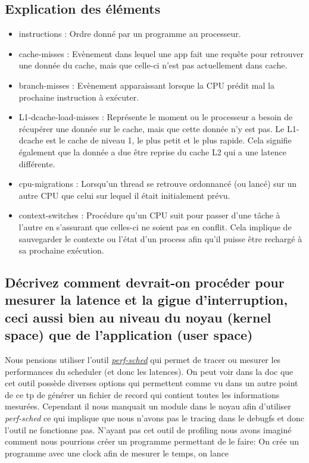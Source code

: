 \documentclass{ReportTemplate}
\begin{document}
\subsection{Explication des éléments}
\begin{itemize}
    \item instructions : Ordre donné par un programme au processeur.
    \item cache-misses : Evènement dans lequel une app fait une requête pour
    retrouver une donnée du cache, mais que celle-ci n'est pas actuellement dans
    cache.
    \item branch-misses : Evènement apparaissant lorsque la CPU prédit mal la
    prochaine instruction à exécuter.
    \item L1-dcache-load-misses : Représente le moment ou le processeur a
    besoin de récupérer une donnée sur le cache, mais que cette donnée n'y est
    pas. Le L1-dcache est le cache de niveau 1, le plus petit et le plus rapide.
    Cela signifie également que la donnée a due être reprise du cache L2 qui a
    une latence différente.
    \item cpu-migrations : Lorsqu'un thread se retrouve ordonnancé (ou lancé)
    sur un autre CPU que celui sur lequel il était initialement prévu.
    \item context-switches : Procédure qu'un CPU suit pour passer d'une tâche à
    l'autre en s'assurant que celles-ci ne soient pas en conflit. Cela implique
    de sauvegarder le contexte ou l'état d'un process afin qu'il puisse être
    rechargé à sa prochaine exécution.
\end{itemize}

\subsection{Décrivez comment devrait-on procéder pour mesurer la latence et la
gigue d’interruption, ceci aussi bien au niveau du noyau (kernel space) que de
l’application (user space)}
Nous pensions utiliser l'outil
\href{https://man7.org/linux/man-pages/man1/perf-sched.1.html}{\textit{perf-sched}}
qui permet de tracer ou mesurer les performances du scheduler (et donc les
latences). On peut voir dans la doc que cet outil possède diverses options qui
permettent comme vu dans un autre point de ce tp de générer un fichier de record
qui contient toutes les informations mesurées. Cependant il nous manquait un
module dans le noyau afin d'utiliser \textit{perf-sched} ce qui implique que
nous n'avons pas le tracing dans le debugfs et donc l'outil ne fonctionne
pas.\newline
N'ayant pas cet outil de profiling nous avons imaginé comment nous pourrions
créer un programme permettant de le faire:\newline
On crée un programme avec une clock afin de mesurer le temps, on lance 
\end{document}
